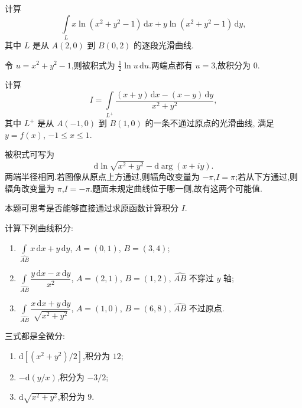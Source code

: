 \begin{example}
    计算
    \[
        \int\limits_Lx\ln(x^2+y^2-1)\,\mathrm{d}x+y\ln(x^2+y^2-1)\,\mathrm{d}y,
    \]
    其中 $L$ 是从 $A(2,0)$ 到 $B(0,2)$ 的逐段光滑曲线.
\end{example}
\exampleblank

\begin{solution}
    令 $u=x^2+y^2-1$,则被积式为 $\frac{1}{2}\ln u\,\mathrm{d}u$.两端点都有 $u=3$,故积分为 $0$.
\end{solution}

\begin{example}
    计算
    \[
        I=\int\limits_{L^+}\dfrac{(x+y)\,\mathrm{d}x-(x-y)\,\mathrm{d}y}{x^2+y^2},
    \]
    其中 $L^+$ 是从 $A(-1,0)$ 到 $B(1,0)$ 的一条不通过原点的光滑曲线, 满足 $y=f(x)$, $-1\leq x\leq1$.
\end{example}
\exampleblank

\begin{solution}
    被积式可写为
    \[
        \mathrm{d}\ln\sqrt{x^2+y^2}-\mathrm{d}\arg(x+iy).
    \]
    两端半径相同.若图像从原点上方通过,则辐角改变量为 $-\pi$,$I=\pi$;若从下方通过,则辐角改变量为 $\pi$,$I=-\pi$.题面未规定曲线位于哪一侧,故有这两个可能值.
\end{solution}

\begin{remark}
    本题可思考是否能够直接通过求原函数计算积分 $I$.
\end{remark}

\begin{example}
    计算下列曲线积分:
    \begin{enumerate}
        \item $\displaystyle\int\limits_{\widehat{AB}}x\,\mathrm{d}x+y\,\mathrm{d}y$, $A=(0,1)$, $B=(3,4)$;
        \item $\displaystyle\int\limits_{\widehat{AB}}\dfrac{y\,\mathrm{d}x-x\,\mathrm{d}y}{x^2}$, $A=(2,1)$, $B=(1,2)$, $\widehat{AB}$ 不穿过 $y$ 轴;
        \item $\displaystyle\int\limits_{\widehat{AB}}\dfrac{x\,\mathrm{d}x+y\,\mathrm{d}y}{\sqrt{x^2+y^2}}$, $A=(1,0)$, $B=(6,8)$, $\widehat{AB}$ 不过原点.
    \end{enumerate}
\end{example}
\exampleblank

\begin{solution}
    三式都是全微分:
    \begin{enumerate}
        \item $\mathrm{d}[(x^2+y^2)/2]$,积分为 $12$;
        \item $-\mathrm{d}(y/x)$,积分为 $-3/2$;
        \item $\mathrm{d}\sqrt{x^2+y^2}$,积分为 $9$.
    \end{enumerate}
\end{solution}

